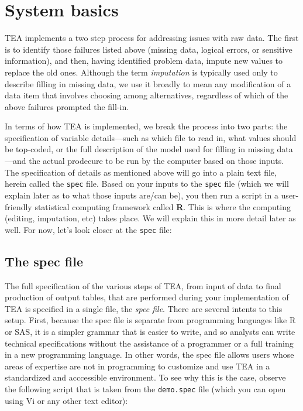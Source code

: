 \documentclass{article}
\begin{document}
\section{System basics}
TEA implements a two step process for addressing issues with raw data. The first is to
identify those failures listed above (missing data, logical errors, or sensitive
information), and then, having identified problem data, impute new values
to replace the old ones. Although the term {\em imputation} is typically used only to 
describe filling in missing data, we use it broadly to mean any modification of a 
data item that involves choosing among alternatives, regardless of which of the 
above failures prompted the fill-in. 

In terms of how TEA is implemented, we break the process into two parts: the 
specification of variable details---such as which file to read in, what values should 
be top-coded, or the full description of the model used for filling in missing 
data---and the actual prodecure to be run by the computer based on those inputs. 
The specification of details as mentioned above will go into a plain text file, 
herein called the {\tt spec} file. Based on your inputs to the {\tt spec} file 
(which we will explain later as to what those inputs are/can be), you then run 
a script in a user-friendly statistical computing framework called {\bf R}. This is 
where the computing (editing, imputation, etc) takes place. We will explain this in 
more detail later as well. For now, let's look closer at the {\tt spec} file: 

\subsection{The spec file}\label{specsec}
The full specification of the various steps of TEA, from input of data to final 
production of output tables, that are performed during your implementation of TEA 
is specified in a single file, the {\em spec file}. There are several intents to 
this setup. First, because the spec file is separate from programming
languages like R or SAS, it is a simpler grammar that is easier to write, and so 
analysts can write technical specifications without the assistance of a programmer or
a full training in a new programming language. In other words, the spec file allows 
users whose areas of expertise are not in programming to customize and use TEA in a 
standardized and acccessible environment. To see why this is the case, observe the 
following script that is taken from the {\tt demo.spec} file (which you can open using 
Vi or any other text editor):
\end{document}
